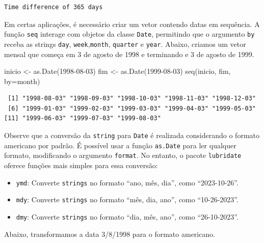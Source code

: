 \documentclass[
  letterpaper,
  DIV=11,
  numbers=noendperiod]{scrreprt}
\newenvironment{Shaded}{\begin{snugshade}}{\end{snugshade}}
\newcommand{\AttributeTok}[1]{\textcolor[rgb]{0.40,0.45,0.13}{#1}}
\newcommand{\FunctionTok}[1]{\textcolor[rgb]{0.28,0.35,0.67}{#1}}
\newcommand{\NormalTok}[1]{\textcolor[rgb]{0.00,0.23,0.31}{#1}}
\newcommand{\OtherTok}[1]{\textcolor[rgb]{0.00,0.23,0.31}{#1}}
\newcommand{\StringTok}[1]{\textcolor[rgb]{0.13,0.47,0.30}{#1}}
\begin{document}
\begin{verbatim}
Time difference of 365 days
\end{verbatim}

Em certas aplicações, é necessário criar um vetor contendo datas em
sequência. A função \texttt{seq} interage com objetos da classe
\texttt{Date}, permitindo que o argumento \texttt{by} receba as strings
\texttt{day}, \texttt{week},\texttt{month}, \texttt{quarter} e
\texttt{year}. Abaixo, criamos um vetor mensal que começa em 3 de agosto
de 1998 e terminando e 3 de agosto de 1999.

\begin{Shaded}
\begin{Highlighting}[]
\NormalTok{inicio }\OtherTok{\textless{}{-}} \FunctionTok{as.Date}\NormalTok{(}\StringTok{\textquotesingle{}1998{-}08{-}03\textquotesingle{}}\NormalTok{)}
\NormalTok{fim }\OtherTok{\textless{}{-}} \FunctionTok{as.Date}\NormalTok{(}\StringTok{\textquotesingle{}1999{-}08{-}03\textquotesingle{}}\NormalTok{)}
\FunctionTok{seq}\NormalTok{(inicio, fim, }\AttributeTok{by=}\StringTok{\textquotesingle{}month\textquotesingle{}}\NormalTok{)}
\end{Highlighting}
\end{Shaded}

\begin{verbatim}
 [1] "1998-08-03" "1998-09-03" "1998-10-03" "1998-11-03" "1998-12-03"
 [6] "1999-01-03" "1999-02-03" "1999-03-03" "1999-04-03" "1999-05-03"
[11] "1999-06-03" "1999-07-03" "1999-08-03"
\end{verbatim}

Observe que a conversão da \texttt{string} para \texttt{Date} é
realizada considerando o formato americano por padrão. É possível usar a
função \texttt{as.Date} para ler qualquer formato, modificando o
argumento \texttt{format}. No entanto, o pacote \texttt{lubridate}
oferece funções mais simples para essa conversão:

\begin{itemize}
\item
  \texttt{ymd}: Converte \texttt{strings} no formato ``ano, mês, dia'',
  como ``2023-10-26''.
\item
  \texttt{mdy}: Converte \texttt{strings} no formato ``mês, dia, ano'',
  como ``10-26-2023''.
\item
  \texttt{dmy}: Converte \texttt{strings} no formato ``dia, mês, ano'',
  como ``26-10-2023''.
\end{itemize}

Abaixo, transformamos a data 3/8/1998 para o formato americano.
\end{document}
